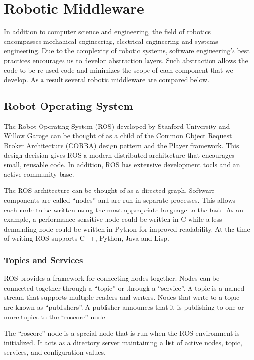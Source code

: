 \chapter{Robotic Middleware}

In addition to computer science and engineering, the field of robotics encompasses mechanical engineering, electrical engineering and systems engineering. Due to the complexity of robotic systems, software engineering's best practices encourages us to develop abstraction layers. Such abstraction allows the code to be re-used code and minimizes the scope of each component that we develop. As a result several robotic middleware are compared below.

\section{Robot Operating System}
The Robot Operating System (ROS) developed by Stanford University and Willow Garage can be thought of as a child of the Common Object Request Broker Architecture (CORBA) design pattern and the Player framework. This design decision gives ROS a modern distributed architecture that encourages small, reusable code. In addition, ROS has extensive development tools and an active community base.

The ROS architecture can be thought of as a directed graph. Software components are called ``nodes'' and are run in separate processes. This allows each node to be written using the most appropriate language to the task. As an example, a performance sensitive node could be written in C while a less demanding node could be written in Python for improved readability. At the time of writing ROS supports C++, Python, Java and Lisp.


\subsection{Topics and Services}
ROS provides a framework for connecting nodes together. Nodes can be connected together through a ``topic'' or through a ``service''. A topic is a named stream that supports multiple readers and writers. Nodes that write to a topic are known as ``publishers''. A publisher announces that it is publishing to one or more topics to the ``roscore'' node. 

The ``roscore'' node is a special node that is run when the ROS environment is initialized. It acts as a directory server maintaining a list of active nodes, topic, services, and configuration values.

